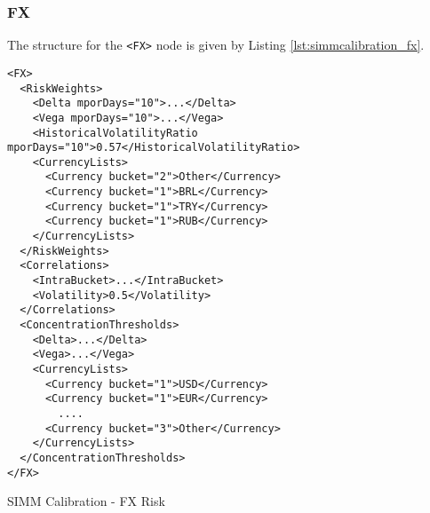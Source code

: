 \subsubsection{FX}
The structure for the {\tt <FX>} node is given by Listing \ref{lst:simmcalibration_fx}.

\begin{listing}[H]
\begin{verbatim}
<FX>
  <RiskWeights>
    <Delta mporDays="10">...</Delta>
    <Vega mporDays="10">...</Vega>
    <HistoricalVolatilityRatio mporDays="10">0.57</HistoricalVolatilityRatio>
    <CurrencyLists>
      <Currency bucket="2">Other</Currency>
      <Currency bucket="1">BRL</Currency>
      <Currency bucket="1">TRY</Currency>
      <Currency bucket="1">RUB</Currency>
    </CurrencyLists>
  </RiskWeights>
  <Correlations>
    <IntraBucket>...</IntraBucket>
    <Volatility>0.5</Volatility>
  </Correlations>
  <ConcentrationThresholds>
    <Delta>...</Delta>
    <Vega>...</Vega>
    <CurrencyLists>
      <Currency bucket="1">USD</Currency>
      <Currency bucket="1">EUR</Currency>
        ....
      <Currency bucket="3">Other</Currency>
    </CurrencyLists>
  </ConcentrationThresholds>
</FX>
\end{verbatim}
\caption{SIMM Calibration - FX Risk}
\label{lst:simmcalibration_fx}
\end{listing}


